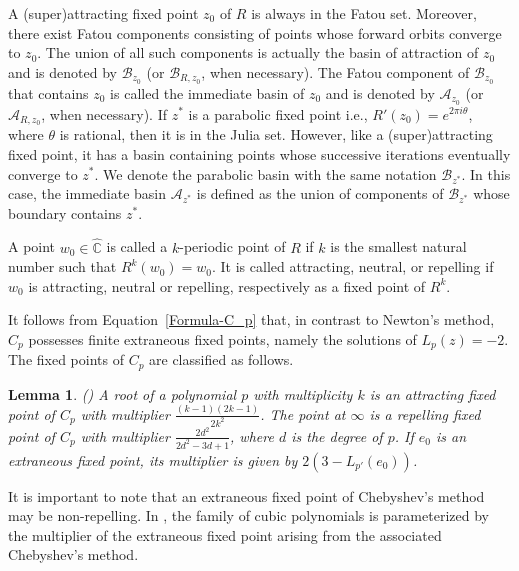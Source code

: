 \documentclass[12pt]{article}
\newtheorem{lem}{Lemma}[section]
\begin{document}
A (super)attracting fixed point $z_0$ of $R$ is always in the Fatou set. Moreover, there exist Fatou components consisting of points whose forward orbits converge to $z_0$. The union of all such components is actually the basin of attraction of $z_0$ and is denoted by $\mathcal{B}_{z_0}$ (or $\mathcal{B}_{R,z_0}$, when necessary). The Fatou component of $\mathcal{B}_{z_0}$ that contains $z_0$ is called the immediate basin of $z_0$ and is denoted by $\mathcal{A}_{z_0}$ (or $\mathcal{A}_{R,z_0}$, when necessary).  If $z^*$ is a parabolic fixed point i.e., $R'(z_0)=e^{2\pi i \theta}$, where $\theta$ is rational, then it is in the Julia set. However, like a (super)attracting fixed point, it has a basin containing points whose successive iterations eventually converge to $z^*$. We denote the parabolic basin with the same notation $\mathcal{B}_{z^*}$. In this case, the immediate basin  $\mathcal{A}_{z^*}$ is defined as the union of components of $\mathcal{B}_{z^*}$ whose boundary contains $z^*$.
\par 
A point $w_0 \in \widehat{\mathbb{C}}$ is called a $k$-periodic point of $R$ if $k$ is the smallest natural number such that $R^k (w_0)=w_0$. It is called attracting, neutral, or repelling if $w_0$ is attracting, neutral or repelling, respectively as a fixed point of $R^k$.
\par
It follows from Equation~\eqref{Formula-C_p} that, in contrast to Newton's method, $C_p$ possesses finite extraneous fixed points, namely the solutions of $L_p(z)=-2$. The fixed points of $C_p$ are classified as follows.

\begin{lem}(\cite[Proposition 2.3]{Nayak-Pal2022})
	A root of a polynomial $p$ with multiplicity $k$ is an attracting fixed point of $C_p$ with multiplier $\frac{(k-1)(2k-1)}{2k^2}$. The point at $\infty$ is a repelling fixed point of $C_p$ with multiplier $\frac{2d^2}{2d^2 -3d+1}$, where $d$ is the degree of $p$. If $e_0$ is an extraneous fixed point, its multiplier is given by $2\left(3-L_{p'}(e_0)\right)$.
	\label{multiplier-fixedpoints}
\end{lem}
It is important to note that an extraneous fixed point of Chebyshev's method may be non-repelling. In \cite{Nayak-Pal2022}, the family of cubic polynomials is parameterized by the multiplier of the extraneous fixed point arising from the associated Chebyshev's method. 
\end{document}
